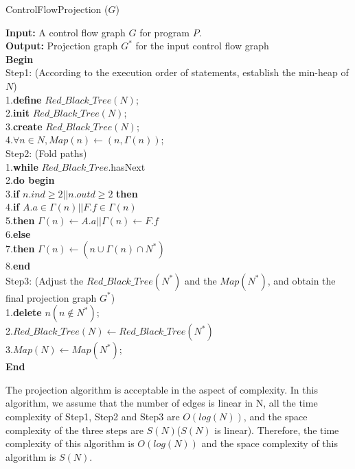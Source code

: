 \begin{algorithm}
\caption{ControlFlowProjection ($G$)}\label{alg:cfp}
\textbf{Input:} A control flow graph $G$ for program $P$.\\
\textbf{Output:} Projection graph $G^*$ for the input control flow graph\\
\textbf{Begin}\\
Step1: (According to the execution order of statements, establish the min-heap of $N$)\\
1.\quad	\textbf{define} $\mathit{Red\_Black\_Tree}(N)$;\\
2.\quad	\textbf{init} $\mathit{Red\_Black\_Tree}(N)$;\\
3.\quad	\textbf{create} $\mathit{Red\_Black\_Tree}(N)$;\\
4.\quad	$\forall n\in N, \mathit{Map}(n)\leftarrow(n,\Gamma(n))$;\\
Step2: (Fold paths)\\
1.\quad	\textbf{while} $\mathit{Red\_Black\_Tree}$.hasNext\\
2.\quad	\textbf{do begin}\\
3.\quad	\textbf{if} $n.ind\geq 2 || n.outd\geq 2$ \textbf{then}\\
4.\quad \quad    \textbf{if} $A.a\in \Gamma(n) || F.f\in \Gamma(n)$\\
5.\quad \quad	    \textbf{then} $\Gamma(n)\leftarrow A.a || \Gamma(n)\leftarrow F.f$\\
6.\quad	\textbf{else} \\
7.\quad \quad   \textbf{then} $\Gamma(n)\leftarrow (n\cup \Gamma(n)\cap N^*)$\\
8.\quad	\textbf{end}\\
Step3: (Adjust the $\mathit{Red\_Black\_Tree}(N^*)$ and the $\mathit{Map}(N^*)$, and obtain the final projection graph $G^*$)\\
1.\quad	\textbf{delete} $n (n\not\in N^*)$;\\
2.\quad	$\mathit{Red\_Black\_Tree(N)} \leftarrow \mathit{Red\_Black\_Tree}(N^*)$\\
3.\quad	$\mathit{Map}(N) \leftarrow \mathit{Map}(N^*)$;\\
\textbf{End}
\end{algorithm}

The projection algorithm is acceptable in the aspect of complexity. In this algorithm, we assume that the number of edges is linear in N, all the time complexity of Step1, Step2 and Step3 are $O(log(N))$, and the space complexity of the three steps are $S(N)$($S(N)$ is linear). Therefore, the time complexity of this algorithm is $O(log(N))$ and the space complexity of this algorithm is $S(N)$.


